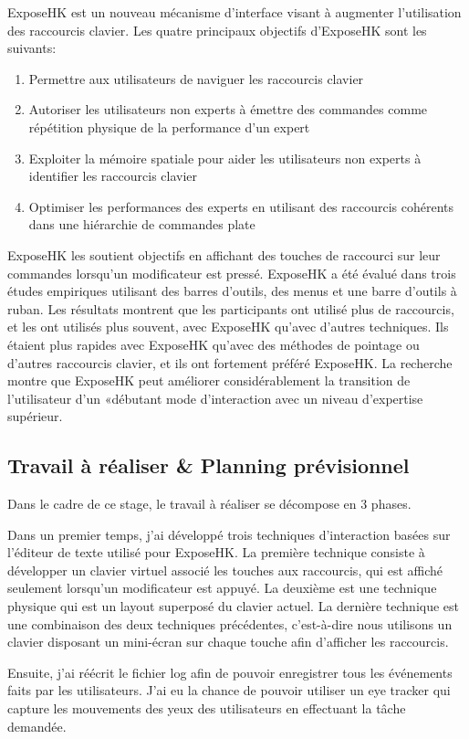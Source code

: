 \documentclass[12pt,a4paper]{article}
\newcommand\tab[1][0.65cm]{\hspace*{#1}}
\begin{document}
ExposeHK est un nouveau mécanisme d'interface visant à augmenter l'utilisation des raccourcis clavier. Les quatre principaux objectifs d'ExposeHK sont les suivants:
\begin{enumerate}
	\item Permettre aux utilisateurs de naviguer les raccourcis clavier
	\item Autoriser les utilisateurs non experts à émettre des commandes comme répétition physique de la performance d'un expert
	\item Exploiter la mémoire spatiale pour aider les utilisateurs non experts à identifier les raccourcis clavier
	\item Optimiser les performances des experts en utilisant des raccourcis cohérents dans une hiérarchie de commandes plate
\end{enumerate}
\tab ExposeHK les soutient objectifs en affichant des touches de raccourci sur leur commandes lorsqu'un modificateur est pressé. ExposeHK a été évalué dans trois études empiriques utilisant des barres d'outils, des menus et une barre d'outils à ruban. Les résultats montrent que les participants ont utilisé plus de raccourcis, et les ont utilisés plus souvent, avec ExposeHK qu'avec d'autres techniques. Ils étaient plus rapides avec ExposeHK qu'avec des méthodes de pointage ou d'autres raccourcis clavier, et ils ont fortement préféré ExposeHK. La recherche montre que ExposeHK peut améliorer considérablement la transition de l'utilisateur d'un «débutant mode d'interaction avec un niveau d'expertise supérieur.\cite{2,3}
\subsection{Travail à réaliser \& Planning prévisionnel}
Dans le cadre de ce stage, le travail à réaliser se décompose en 3 phases.

Dans un premier temps, j'ai développé trois techniques d'interaction basées sur l'éditeur de texte utilisé pour ExposeHK. La première technique consiste à développer un clavier virtuel associé les touches aux raccourcis, qui est affiché seulement lorsqu'un modificateur est appuyé. La deuxième est une technique physique qui est un layout superposé du clavier actuel. La dernière technique est une combinaison des deux techniques précédentes, c'est-à-dire nous utilisons un clavier disposant un mini-écran sur chaque touche afin d'afficher les raccourcis.

Ensuite, j'ai réécrit le fichier log afin de pouvoir enregistrer tous les événements faits par les utilisateurs. J'ai eu la chance de pouvoir utiliser un eye tracker qui capture les mouvements des yeux des utilisateurs en effectuant la tâche demandée.
\end{document}
